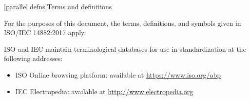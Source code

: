 
[parallel.defns]{Terms and definitions}

\pnum
For the purposes of this document,
the terms, definitions, and symbols
given in ISO/IEC 14882:2017
apply.

\pnum
ISO and IEC maintain terminological databases for use in standardization at the following addresses:
\begin{itemize}
  \item ISO Online browsing platform: available at \url{https://www.iso.org/obp}
  \item IEC Electropedia: available at \url{http://www.electropedia.org}
\end{itemize}

